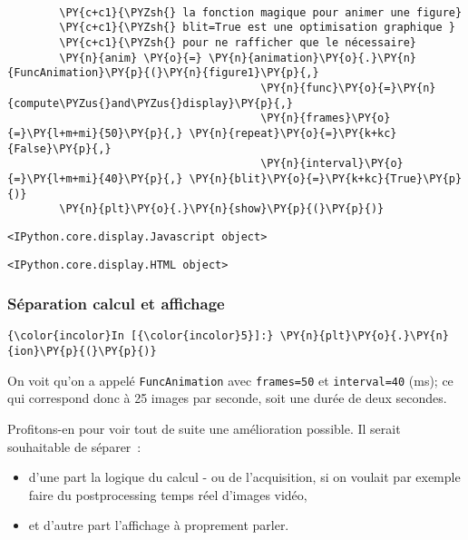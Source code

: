 \begin{Verbatim}[commandchars=\\\{\},frame=single,framerule=0.3mm,rulecolor=\color{cellframecolor}]
        
        \PY{c+c1}{\PYZsh{} la fonction magique pour animer une figure}
        \PY{c+c1}{\PYZsh{} blit=True est une optimisation graphique }
        \PY{c+c1}{\PYZsh{} pour ne rafficher que le nécessaire}
        \PY{n}{anim} \PY{o}{=} \PY{n}{animation}\PY{o}{.}\PY{n}{FuncAnimation}\PY{p}{(}\PY{n}{figure1}\PY{p}{,} 
                                       \PY{n}{func}\PY{o}{=}\PY{n}{compute\PYZus{}and\PYZus{}display}\PY{p}{,} 
                                       \PY{n}{frames}\PY{o}{=}\PY{l+m+mi}{50}\PY{p}{,} \PY{n}{repeat}\PY{o}{=}\PY{k+kc}{False}\PY{p}{,}
                                       \PY{n}{interval}\PY{o}{=}\PY{l+m+mi}{40}\PY{p}{,} \PY{n}{blit}\PY{o}{=}\PY{k+kc}{True}\PY{p}{)}
        \PY{n}{plt}\PY{o}{.}\PY{n}{show}\PY{p}{(}\PY{p}{)}
\end{Verbatim}


    
    \begin{verbatim}
<IPython.core.display.Javascript object>
    \end{verbatim}

    
    
    \begin{verbatim}
<IPython.core.display.HTML object>
    \end{verbatim}

    
    \hypertarget{suxe9paration-calcul-et-affichage}{%
\subsubsection{Séparation calcul et
affichage}\label{suxe9paration-calcul-et-affichage}}

    \begin{Verbatim}[commandchars=\\\{\},frame=single,framerule=0.3mm,rulecolor=\color{cellframecolor}]
{\color{incolor}In [{\color{incolor}5}]:} \PY{n}{plt}\PY{o}{.}\PY{n}{ion}\PY{p}{(}\PY{p}{)}
\end{Verbatim}


    On voit qu'on a appelé \texttt{FuncAnimation} avec \texttt{frames=50} et
\texttt{interval=40} (ms); ce qui correspond donc à 25 images par
seconde, soit une durée de deux secondes.

Profitons-en pour voir tout de suite une amélioration possible. Il
serait souhaitable de séparer~:

\begin{itemize}
\tightlist
\item
  d'une part la logique du calcul - ou de l'acquisition, si on voulait
  par exemple faire du postprocessing temps réel d'images vidéo,
\item
  et d'autre part l'affichage à proprement parler.
\end{itemize}

